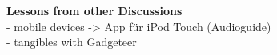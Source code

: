 \textbf{Lessons from other Discussions}
\\- mobile devices -> App für iPod Touch (Audioguide)
\\- tangibles with Gadgeteer

%
